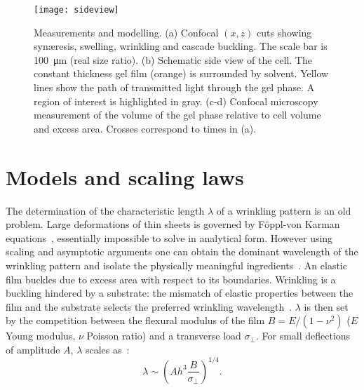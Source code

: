 \documentclass[twocolumn,superscriptaddress,showpacs,preprintnumbers,
amsmath,amssymb,prl]{revtex4-1}
\begin{document}
\begin{figure}
	\texttt{[image: sideview]}
	\caption{Measurements and modelling. (a) Confocal $(x,z)$ cuts showing syn\ae{}resis, swelling, wrinkling and cascade buckling. The scale bar is \SI{100}{\micro\metre} (real size ratio). (b) Schematic side view of the cell. The constant thickness gel film (orange) is surrounded by solvent. Yellow lines show the path of transmitted light through the gel phase. A region of interest is highlighted in gray. (c-d) Confocal microscopy measurement of the volume of the gel phase relative to cell volume and excess area. Crosses correspond to times in (a).}
	\label{fig:sideview}
\end{figure}

\section*{Models and scaling laws}


The determination of the characteristic length $\lambda$ of a wrinkling pattern is an old problem. Large deformations of thin sheets is governed by F\"{o}ppl-von Karman equations~\cite{landau1986}, essentially impossible to solve in analytical form. However using scaling and asymptotic arguments one can obtain the dominant wavelength of the wrinkling pattern and isolate the physically meaningful ingredients~\cite{Cerda2003}. An elastic film buckles due to excess area with respect to its boundaries. Wrinkling is a buckling hindered by a substrate: the mismatch of elastic properties between the film and the substrate selects the preferred wrinkling wavelength~\cite{Gough1940, Bijlaard1946}. $\lambda$ is then set by the competition between the flexural modulus of the film $B=E/(1-\nu^2)$ ($E$ Young modulus, $\nu$ Poisson ratio) and a transverse load $\sigma_\perp$. For small deflections of  amplitude $A$, $\lambda$ scales as~\cite{Vella2009,Kolinski2009}: 
%
\begin{equation}
\lambda \sim \left( A h^3 \frac{B}{\sigma_{\perp}} \right)^{1/4}.
\label{eq:lstar}
\end{equation}


\end{document}
